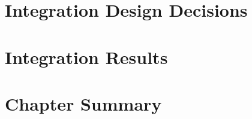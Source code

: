 

\section{Integration Design Decisions}







\section{Integration Results}



\section{Chapter Summary}

